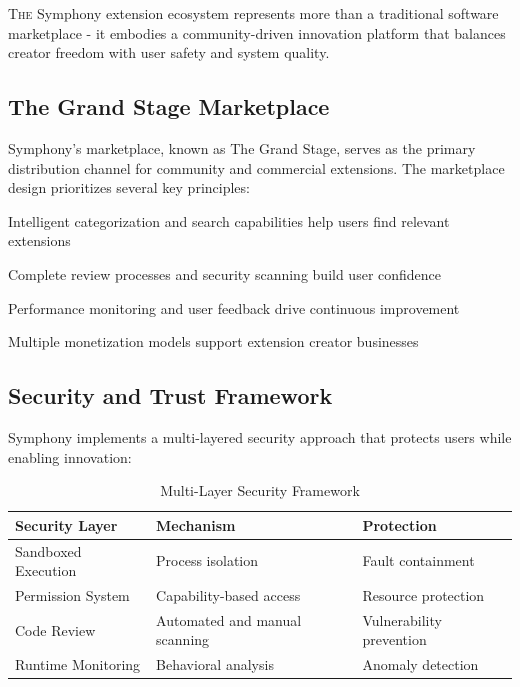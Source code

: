 
\lettrine{T}{he} Symphony extension ecosystem represents more than a traditional software marketplace - it embodies a \textcolor{brandPrimary}{community-driven innovation platform} that balances creator freedom with user safety and system quality.

\subsection*{The Grand Stage Marketplace}

Symphony's marketplace, known as The Grand Stage, serves as the primary distribution channel for community and commercial extensions. The marketplace design prioritizes several key principles:

\begin{description}[leftmargin=3cm,labelwidth=2.5cm]
    \item[\textbf{Discovery}] Intelligent categorization and search capabilities help users find relevant extensions
    \item[\textbf{Trust}] Complete review processes and security scanning build user confidence
    \item[\textbf{Quality}] Performance monitoring and user feedback drive continuous improvement
    \item[\textbf{Sustainability}] Multiple monetization models support extension creator businesses
\end{description}

\subsection*{Security and Trust Framework}

Symphony implements a \textcolor{brandSecondary}{multi-layered security approach} that protects users while enabling innovation:

\begin{table}[ht]
\centering
\begin{tabular}{@{}lll@{}}
\toprule
\textbf{Security Layer} & \textbf{Mechanism} & \textbf{Protection} \\
\midrule
Sandboxed Execution & Process isolation & Fault containment \\
Permission System & Capability-based access & Resource protection \\
Code Review & Automated and manual scanning & Vulnerability prevention \\
Runtime Monitoring & Behavioral analysis & Anomaly detection \\
\bottomrule
\end{tabular}
\caption{Multi-Layer Security Framework}
\end{table}

